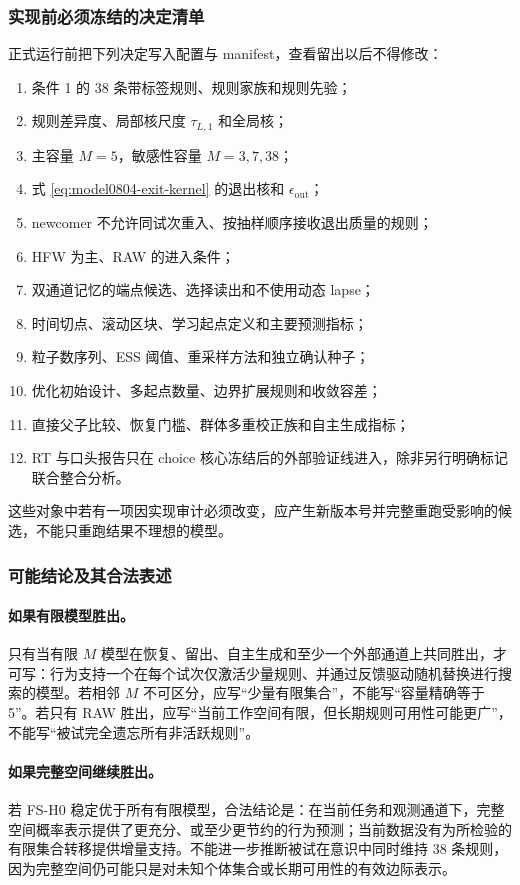 \subsubsection{实现前必须冻结的决定清单}

正式运行前把下列决定写入配置与 manifest，查看留出以后不得修改：
\begin{enumerate}
    \item 条件 1 的 38 条带标签规则、规则家族和规则先验；
    \item 规则差异度、局部核尺度 $\tau_{L,1}$ 和全局核；
    \item 主容量 $M=5$，敏感性容量 $M=3,7,38$；
    \item 式 \ref{eq:model0804-exit-kernel} 的退出核和 $\epsilon_{\mathrm{out}}$；
    \item newcomer 不允许同试次重入、按抽样顺序接收退出质量的规则；
    \item HFW 为主、RAW 的进入条件；
    \item 双通道记忆的端点候选、选择读出和不使用动态 lapse；
    \item 时间切点、滚动区块、学习起点定义和主要预测指标；
    \item 粒子数序列、ESS 阈值、重采样方法和独立确认种子；
    \item 优化初始设计、多起点数量、边界扩展规则和收敛容差；
    \item 直接父子比较、恢复门槛、群体多重校正族和自主生成指标；
    \item RT 与口头报告只在 choice 核心冻结后的外部验证线进入，除非另行明确标记联合整合分析。
\end{enumerate}
这些对象中若有一项因实现审计必须改变，应产生新版本号并完整重跑受影响的候选，不能只重跑结果不理想的模型。


\subsubsection{可能结论及其合法表述}

\paragraph{如果有限模型胜出。}
只有当有限 $M$ 模型在恢复、留出、自主生成和至少一个外部通道上共同胜出，才可写：行为支持一个在每个试次仅激活少量规则、并通过反馈驱动随机替换进行搜索的模型。若相邻 $M$ 不可区分，应写“少量有限集合”，不能写“容量精确等于 5”。若只有 RAW 胜出，应写“当前工作空间有限，但长期规则可用性可能更广”，不能写“被试完全遗忘所有非活跃规则”。

\paragraph{如果完整空间继续胜出。}
若 FS-H0 稳定优于所有有限模型，合法结论是：在当前任务和观测通道下，完整空间概率表示提供了更充分、或至少更节约的行为预测；当前数据没有为所检验的有限集合转移提供增量支持。不能进一步推断被试在意识中同时维持 38 条规则，因为完整空间仍可能只是对未知个体集合或长期可用性的有效边际表示。

